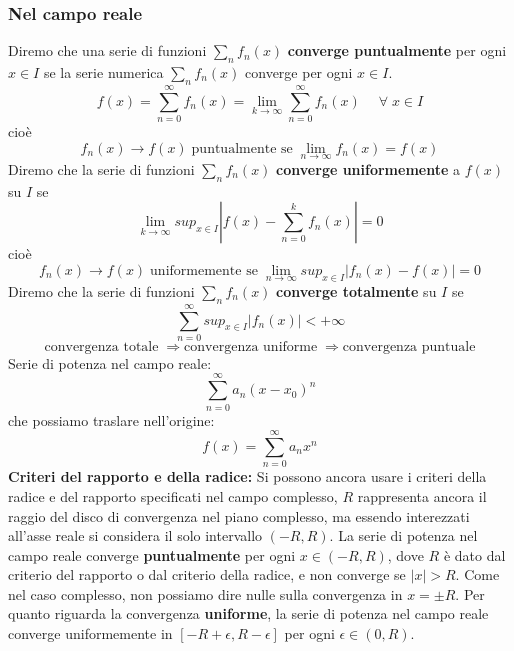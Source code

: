 \subsubsection*{Nel campo reale}
Diremo che una serie di funzioni $\sum_{n}f_n(x)$ \textbf{converge puntualmente} per ogni $x \in I$ se la serie numerica $\sum_{n}f_n(x)$ converge per ogni $x \in I$.
\[
    f(x) = \sum_{n=0}^{\infty} f_n(x) = \lim_{k\rightarrow \infty} \sum_{n=0}^{\infty} f_n(x) \quad \;\forall\;x \in I
\]
cioè
\[
    f_n(x) \rightarrow f(x) \; \text{puntualmente se}\; \lim_{n\rightarrow \infty} f_n(x) = f(x) 
\]
\newline
Diremo che la serie di funzioni $\sum_{n}f_n(x)$ \textbf{converge uniformemente} a $f(x)$ su $I$ se
\[
    \lim_{k\rightarrow \infty} sup_{x \in I}\left| f(x) - \sum_{n=0}^{k}f_n(x) \right| = 0
\]
cioè
\[
    f_n(x) \rightarrow f(x) \; \text{uniformemente se}\; \lim_{n\rightarrow \infty} sup_{x \in I}\left| f_n(x) - f(x) \right| = 0
\]
\newline
Diremo che la serie di funzioni $\sum_{n}f_n(x)$ \textbf{converge totalmente} su $I$ se
\[
    \sum_{n=0}^{\infty} sup_{x \in I}\left| f_n(x) \right| < + \infty
\]
\newline
\[
    \text{convergenza totale}\; \Longrightarrow \text{convergenza uniforme}\; \Longrightarrow \text{convergenza puntuale}
\]
\newline
Serie di potenza nel campo reale:
\[
    \sum_{n=0}^{\infty} a_n(x-x_0)^n
\]
che possiamo traslare nell'origine:
\[
    f(x) = \sum_{n=0}^{\infty} a_n x^n
\]
\newline
\textbf{Criteri del rapporto e della radice:} Si possono ancora usare i criteri della radice e del rapporto specificati nel campo complesso, $R$ rappresenta ancora il raggio del disco di convergenza nel piano complesso, ma essendo interezzati all'asse reale si considera il solo intervallo $(-R, R)$.\newline
La serie di potenza nel campo reale converge \textbf{puntualmente} per ogni $x \in (-R, R)$, dove $R$ è dato dal criterio del rapporto o dal criterio della radice, e non converge se $|x| > R$.\newline
Come nel caso complesso, non possiamo dire nulle sulla convergenza in $x = \pm R$.\newline
Per quanto riguarda la convergenza \textbf{uniforme}, la serie di potenza nel campo reale converge uniformemente in $[-R+\epsilon, R- \epsilon]$ per ogni $\epsilon \in (0,R)$.\newline
\newline
